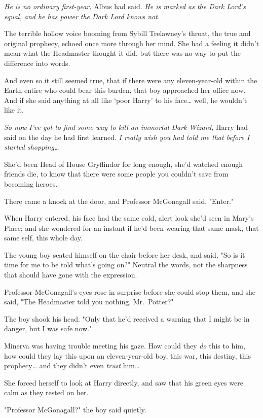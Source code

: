 \emph{He is no ordinary first-year,} Albus had said. \emph{He is marked as the
Dark Lord's equal, and he has power the Dark Lord knows not.}

The terrible hollow voice booming from Sybill Trelawney's throat, the true and
original prophecy, echoed once more through her mind. She had a feeling it
didn't mean what the Headmaster thought it did, but there was no way to put the
difference into words.

And even so it still seemed true, that if there were any eleven-year-old within
the Earth entire who could bear this burden, that boy approached her office
now. And if she said anything at all like `poor Harry' to his face{\ldots}
well, he wouldn't like it.

\emph{So now I've got to find some way to kill an immortal Dark Wizard,} Harry
had said on the day he had first learned. \emph{I really wish you had told me
that before I started shopping{\ldots}}

She'd been Head of House Gryffindor for long enough, she'd watched enough
friends die, to know that there were some people you couldn't save from
becoming heroes.

There came a knock at the door, and Professor McGonagall said, "Enter."

When Harry entered, his face had the same cold, alert look she'd seen in Mary's
Place; and she wondered for an instant if he'd been wearing that same mask,
that same self, this whole day.

The young boy seated himself on the chair before her desk, and said, "So is it
time for me to be told what's going on?" Neutral the words, not the sharpness
that should have gone with the expression.

Professor McGonagall's eyes rose in surprise before she could stop them, and
she said, "The Headmaster told you nothing, Mr.~Potter?"

The boy shook his head. "Only that he'd received a warning that I might be in
danger, but I was safe now."

Minerva was having trouble meeting his gaze. How could they \emph{do} this to
him, how could they lay this upon an eleven-year-old boy, this war, this
destiny, this prophecy{\ldots} and they didn't even \emph{trust} him{\ldots}

She forced herself to look at Harry directly, and saw that his green eyes were
calm as they rested on her.

"Professor McGonagall?" the boy said quietly.

